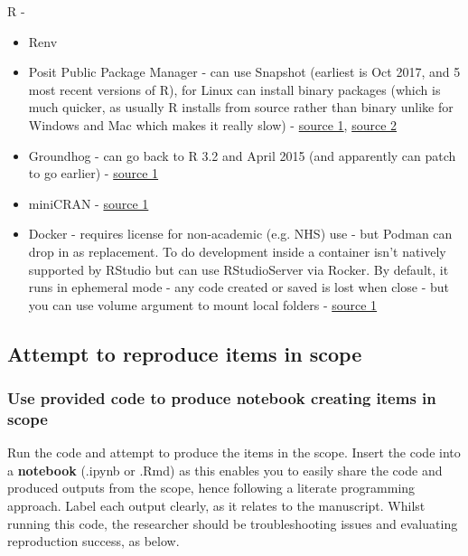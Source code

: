 R -
\begin{itemize}
    \item Renv
    \item Posit Public Package Manager - can use Snapshot (earliest is Oct 2017, and 5 most recent versions of R), for Linux can install binary packages (which is much quicker, as usually R installs from source rather than binary unlike for Windows and Mac which makes it really slow) - \href{https://packagemanager.posit.co/client/#/repos/cran/setup}{source 1}, \href{https://docs.posit.co/faq/p3m-faq/#frequently-asked-questions}{source 2}
    \item Groundhog - can go back to R 3.2 and April 2015 (and apparently can patch to go earlier) - \href{https://www.brodrigues.co/blog/2023-01-12-repro_r/}{source 1}
    \item miniCRAN - \href{https://learn.microsoft.com/en-us/sql/machine-learning/package-management/create-a-local-package-repository-using-minicran?view=sql-server-ver16}{source 1}
    \item Docker - requires license for non-academic (e.g. NHS) use - but Podman can drop in as replacement. To do development inside a container isn't natively supported by RStudio but can use RStudioServer via Rocker. By default, it runs in ephemeral mode - any code created or saved is lost when close - but you can use volume argument to mount local folders - \href{https://towardsdatascience.com/running-rstudio-inside-a-container-e9db5e809ff8}{source 1}
\end{itemize}

\subsection{Attempt to reproduce items in scope}

\subsubsection{Use provided code to produce notebook creating items in scope}

Run the code and attempt to produce the items in the scope. Insert the code into a \textbf{notebook} (.ipynb or .Rmd) as this enables you to easily share the code and produced outputs from the scope, hence following a literate programming approach. Label each output clearly, as it relates to the manuscript. Whilst running this code, the researcher should be troubleshooting issues and evaluating reproduction success, as below.

